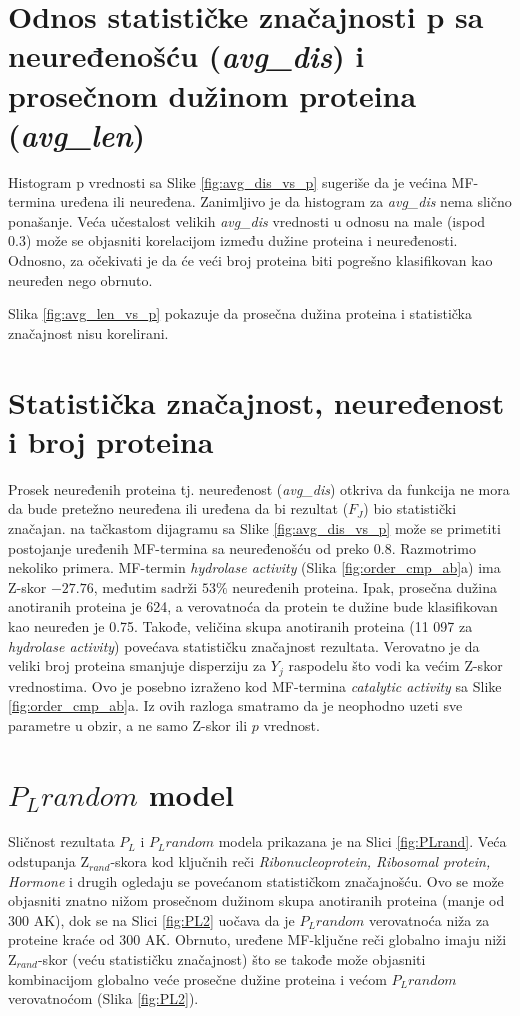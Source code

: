 \section{Odnos statističke značajnosti p sa neuređenošću (\textit{avg\_dis}) i prosečnom dužinom proteina (\textit{avg\_len}) }

Histogram p vrednosti sa Slike \ref{fig:avg_dis_vs_p} sugeriše da je većina
MF-termina uređena ili neuređena. Zanimljivo je da histogram za
\textit{avg\_dis} nema slično ponašanje. Veća učestalost velikih
\textit{avg\_dis} vrednosti u odnosu na male (ispod 0.3) može se objasniti
korelacijom između dužine proteina i neuređenosti. Odnosno, za očekivati je da
će veći broj proteina biti pogrešno klasifikovan kao neuređen nego obrnuto.

Slika \ref{fig:avg_len_vs_p} pokazuje da prosečna dužina proteina 
i statistička značajnost nisu korelirani. 

\section{Statistička značajnost, neuređenost i broj proteina}

Prosek neuređenih proteina tj. neuređenost  (\textit{avg\_dis}) otkriva da
funkcija ne mora da bude pretežno neuređena ili uređena da bi rezultat ($F_J$)
bio statistički značajan. na tačkastom dijagramu sa
Slike \ref{fig:avg_dis_vs_p} može se primetiti postojanje uređenih
MF-termina sa neuređenošću od preko 0.8.  Razmotrimo nekoliko primera.
MF-termin \textit{hydrolase activity} (Slika \ref{fig:order_cmp_ab}a) ima
Z-skor $-27.76$, međutim sadrži $53\%$ neuređenih proteina. Ipak, prosečna
dužina anotiranih proteina je 624, a verovatnoća da protein te dužine bude
klasifikovan kao neuređen je 0.75.  Takođe, veličina skupa anotiranih proteina
(11 097 za \textit{hydrolase activity}) povećava statističku značajnost
rezultata. Verovatno je da veliki broj proteina smanjuje disperziju za $Y_j$
raspodelu što vodi ka većim Z-skor vrednostima.  Ovo je posebno izraženo kod
MF-termina \textit{catalytic activity} sa Slike \ref{fig:order_cmp_ab}a.  Iz
ovih razloga smatramo da je neophodno uzeti sve parametre u obzir, a ne samo
Z-skor ili $p$ vrednost.

\section{$P_Lrandom$ model}

Sličnost rezultata $P_L$ i $P_L random$ modela prikazana je na Slici
\ref{fig:PLrand}. Veća odstupanja Z$_{rand}$-skora kod ključnih reči
\textit{Ribonucleoprotein, Ribosomal protein, Hormone} i drugih ogledaju se
povećanom statističkom značajnošću. Ovo se može objasniti znatno
nižom prosečnom dužinom skupa anotiranih proteina (manje od 300 AK), dok se na
Slici \ref{fig:PL2} uočava da je $P_L random$ verovatnoća niža za proteine
kraće od 300 AK.  Obrnuto, uređene MF-ključne reči globalno imaju niži
Z$_{rand}$-skor (veću statističku značajnost) što se takođe može objasniti
kombinacijom globalno veće prosečne dužine proteina i većom $P_L random$
verovatnoćom (Slika \ref{fig:PL2}). 

